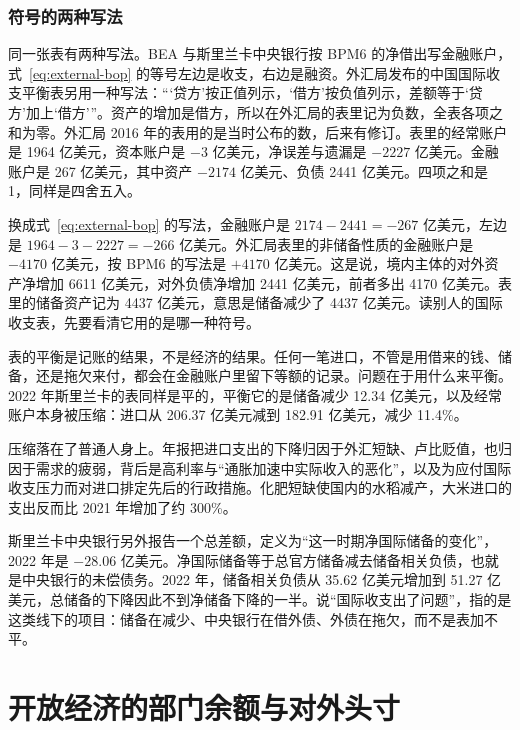 \subsubsection{符号的两种写法}
同一张表有两种写法。BEA 与斯里兰卡中央银行按 BPM6 的净借出写金融账户，式~\eqref{eq:external-bop} 的等号左边是收支，右边是融资。外汇局发布的中国国际收支平衡表另用一种写法：“‘贷方’按正值列示，‘借方’按负值列示，差额等于‘贷方’加上‘借方’”\cite{safe2017}。资产的增加是借方，所以在外汇局的表里记为负数，全表各项之和为零。外汇局 2016 年的表用的是当时公布的数，后来有修订。表里的经常账户是 1964 亿美元，资本账户是 $-3$ 亿美元，净误差与遗漏是 $-2227$ 亿美元。金融账户是 267 亿美元，其中资产 $-2174$ 亿美元、负债 2441 亿美元\cite{safe2017}。四项之和是 1，同样是四舍五入。

换成式~\eqref{eq:external-bop} 的写法，金融账户是 $2174-2441=-267$ 亿美元，左边是 $1964-3-2227=-266$ 亿美元。外汇局表里的非储备性质的金融账户是 $-4170$ 亿美元，按 BPM6 的写法是 $+4170$ 亿美元。这是说，境内主体的对外资产净增加 6611 亿美元，对外负债净增加 2441 亿美元，前者多出 4170 亿美元。表里的储备资产记为 4437 亿美元，意思是储备减少了 4437 亿美元\cite{safe2017}。读别人的国际收支表，先要看清它用的是哪一种符号。

\begin{pitfall}
表的平衡是记账的结果，不是经济的结果。任何一笔进口，不管是用借来的钱、储备，还是拖欠来付，都会在金融账户里留下等额的记录。问题在于用什么来平衡。2022 年斯里兰卡的表同样是平的，平衡它的是储备减少 12.34 亿美元，以及经常账户本身被压缩：进口从 206.37 亿美元减到 182.91 亿美元，减少 11.4\%。

压缩落在了普通人身上。年报把进口支出的下降归因于外汇短缺、卢比贬值，也归因于需求的疲弱，背后是高利率与“通胀加速中实际收入的恶化”，以及为应付国际收支压力而对进口排定先后的行政措施。化肥短缺使国内的水稻减产，大米进口的支出反而比 2021 年增加了约 300\%\cite{cbsl2023ar}。

斯里兰卡中央银行另外报告一个总差额，定义为“这一时期净国际储备的变化”，2022 年是 $-28.06$ 亿美元\cite{cbsl2023ar}。净国际储备等于总官方储备减去储备相关负债，也就是中央银行的未偿债务。2022 年，储备相关负债从 35.62 亿美元增加到 51.27 亿美元，总储备的下降因此不到净储备下降的一半。说“国际收支出了问题”，指的是这类线下的项目：储备在减少、中央银行在借外债、外债在拖欠，而不是表加不平。
\end{pitfall}

\section{开放经济的部门余额与对外头寸}\label{sec:external-position}

